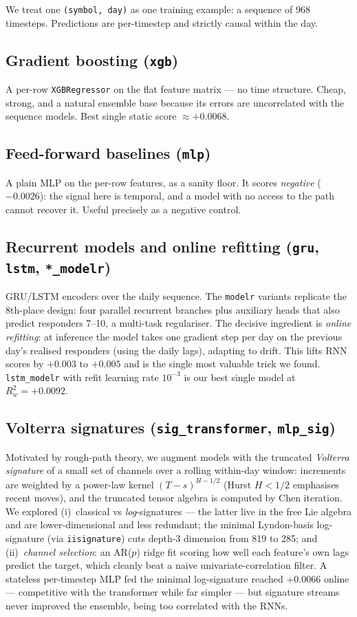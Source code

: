\documentclass[11pt]{article}
\newcommand{\Rw}{R^2_w}
\begin{document}
We treat one \texttt{(symbol, day)} as one training example: a sequence of 968
timesteps. Predictions are per-timestep and strictly causal within the day.

\subsection{Gradient boosting (\texttt{xgb})}
A per-row \texttt{XGBRegressor} on the flat feature matrix --- no time
structure. Cheap, strong, and a natural ensemble base because its errors are
uncorrelated with the sequence models. Best single static score $\approx
+0.0068$.

\subsection{Feed-forward baselines (\texttt{mlp})}
A plain MLP on the per-row features, as a sanity floor. It scores
\emph{negative} ($-0.0026$): the signal here is temporal, and a model with no
access to the path cannot recover it. Useful precisely as a negative control.

\subsection{Recurrent models and online refitting (\texttt{gru}, \texttt{lstm}, \texttt{*\_modelr})}
GRU/LSTM encoders over the daily sequence. The \texttt{modelr} variants
replicate the 8th-place design: four parallel recurrent branches plus auxiliary
heads that also predict responders 7--10, a multi-task regulariser. The
decisive ingredient is \emph{online refitting}: at inference the model takes one
gradient step per day on the previous day's realised responders (using the
daily lags), adapting to drift. This lifts RNN scores by $+0.003$ to $+0.005$
and is the single most valuable trick we found. \texttt{lstm\_modelr} with
refit learning rate $10^{-3}$ is our best single model at $\Rw = +0.0092$.

\subsection{Volterra signatures (\texttt{sig\_transformer}, \texttt{mlp\_sig})}
Motivated by rough-path theory, we augment models with the truncated
\emph{Volterra signature} of a small set of channels over a rolling within-day
window: increments are weighted by a power-law kernel $(T-s)^{H-1/2}$ (Hurst
$H<1/2$ emphasises recent moves), and the truncated tensor algebra is computed
by Chen iteration. We explored (i)~classical vs \emph{log}-signatures --- the
latter live in the free Lie algebra and are lower-dimensional and less
redundant; the minimal Lyndon-basis log-signature (via \texttt{iisignature})
cuts depth-3 dimension from 819 to 285; and (ii)~\emph{channel selection}: an
AR($p$) ridge fit scoring how well each feature's own lags predict the target,
which cleanly beat a naive univariate-correlation filter. A stateless
per-timestep MLP fed the minimal log-signature reached $+0.0066$ online ---
competitive with the transformer while far simpler --- but signature streams
never improved the ensemble, being too correlated with the RNNs.
\end{document}
